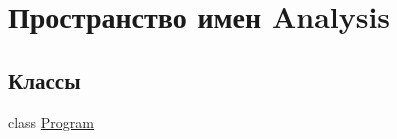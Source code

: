 \hypertarget{namespace_analysis}{}\section{Пространство имен Analysis}
\label{namespace_analysis}
\subsection*{Классы}
\begin{DoxyCompactItemize}
\item 
class \hyperlink{class_analysis_1_1_program}{Program}
\end{DoxyCompactItemize}
